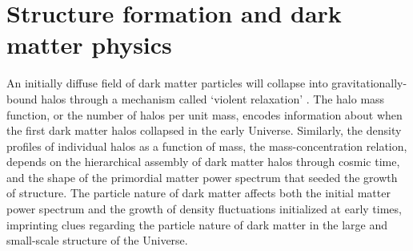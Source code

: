 \section{Structure formation and dark matter physics}
\indent An initially diffuse field of dark matter particles will collapse into gravitationally-bound halos through a mechanism called `violent relaxation' \citep{LyndenBell67}. The halo mass function, or the number of halos per unit mass, encodes information about when the first dark matter halos collapsed in the early Universe. Similarly, the density profiles of individual halos as a function of mass, the mass-concentration relation, depends on the hierarchical assembly of dark matter halos through cosmic time, and the shape of the primordial matter power spectrum that seeded the growth of structure. The particle nature of dark matter affects both the initial matter power spectrum and the growth of density fluctuations initialized at early times, imprinting clues regarding the particle nature of dark matter in the large and small-scale structure of the Universe. 


